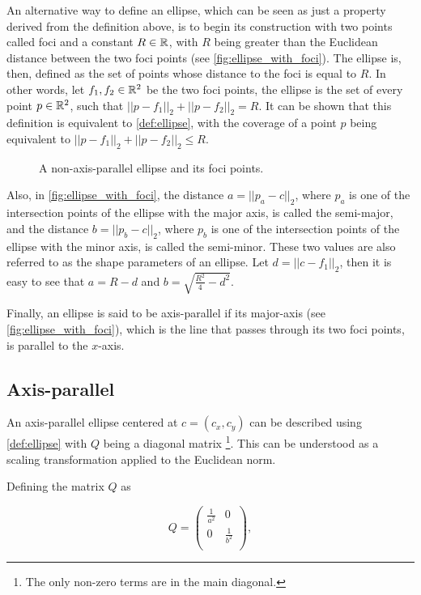 An alternative way to define an ellipse, which can be seen as just a property derived from the definition above, is to begin its construction with two points called foci and a constant $R \in \mathbb{R}$, with $R$ being greater than the Euclidean distance between the two foci points (see \autoref{fig:ellipse_with_foci}). The ellipse is, then, defined as the set of points whose distance to the foci is equal to $R$. In other words, let $f_1, f_2 \in \mathbb{R}^2$ be the two foci points, the ellipse is the set of every point $p \in \mathbb{R}^2$, such that $||p-f_1||_2 + ||p-f_2||_2 = R$. It can be shown that this definition is equivalent to \autoref{def:ellipse}, with the coverage of a point $p$ being equivalent to $||p-f_1||_2 + ||p-f_2||_2 \le R$.

\begin{figure}[H]
    \centering
    
    \caption{A non-axis-parallel ellipse and its foci points.}
    
    \fautor
    \label{fig:ellipse_with_foci}
\end{figure}

Also, in \autoref{fig:ellipse_with_foci}, the distance $a = ||p_a - c||_2$, where $p_a$ is one of the intersection points of the ellipse with the major axis, is called the semi-major, and the distance $b = ||p_b-c||_2$, where $p_b$ is one of the intersection points of the ellipse with the minor axis, is called the semi-minor. These two values are also referred to as the shape parameters of an ellipse. Let $d = ||c-f_1||_2$, then it is easy to see that $a = R - d$ and $b = \sqrt{\frac{R^2}{4} - d^2}$.

Finally, an ellipse is said to be axis-parallel if its major-axis (see \autoref{fig:ellipse_with_foci}), which is the line that passes through its two foci points, is parallel to the $x$-axis.

\subsection{Axis-parallel}

An axis-parallel ellipse centered at $c = (c_x,c_y)$ can be described using \autoref{def:ellipse} with $Q$ being a diagonal matrix \footnote{The only non-zero terms are in the main diagonal.}. This can be understood as a scaling transformation applied to the Euclidean norm.

Defining the matrix $Q$ as

\[
Q=
\left( {\begin{array}{cc}
    \frac{1}{a^2} & 0 \\
    0 & \frac{1}{b^2} \\
    \end{array} } \right),
\]

